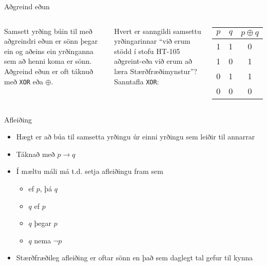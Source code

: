 \documentclass[handout]{beamer}
\begin{document}
\begin{frame}{Aðgreind eðun}
\begin{columns}
Samsett yrðing búin til með aðgreindri eðun er sönn þegar ein og aðeins ein yrðinganna sem að henni koma er sönn. Aðgreind eðun er oft táknuð með \texttt{XOR} eða $\oplus$.

\vspace*{0.5cm}
Hvert er sanngildi samsettu yrðingarinnar ``við erum stödd í stofu HT-105 aðgreint-eða við erum að læra Stærðfræðimynstur''?
Sanntafla \texttt{XOR}:
\begin{center}
\begin{tabular}{ccc}
\toprule
$p$&$q$&$p \oplus q$ \\
\midrule
1&1&0\\
1&0&1\\
0&1&1\\
0&0&0\\
\bottomrule
\end{tabular}
\end{center}
\end{columns}
\end{frame}

\begin{frame}{Afleiðing}
\begin{itemize}
 \item Hægt er að búa til samsetta yrðingu úr einni yrðingu sem leiðir til annarrar
 \item Táknað með $p \to q$
 \item Í mæltu máli má t.d. setja afleiðingu fram sem
 \begin{itemize}
  \item ef $p$, þá $q$
  \item $q$ ef $p$
  \item $q$ þegar $p$
  \item $q$ nema $\neg p$
 \end{itemize}
 \item Stærðfræðileg afleiðing er oftar sönn en það sem daglegt tal gefur til kynna
\end{itemize}
\end{frame}
\end{document}
